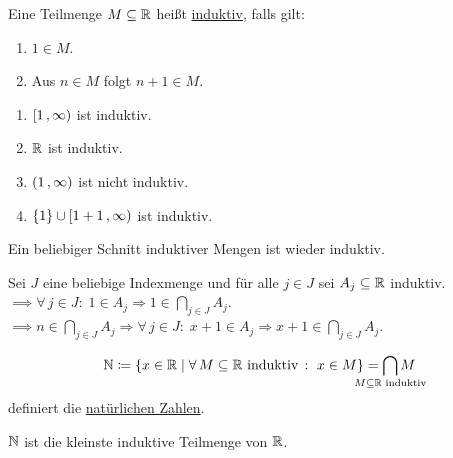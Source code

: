 \documentclass[../ana1.tex]{subfiles}
\begin{document}
\iftoggle{short}{}{\newpage}%

\begin{defi}
	Eine Teilmenge \(M \subseteq \mathbb{R} \) heißt \underline{induktiv}, falls gilt:
	\begin{enumerate}[label= (I\arabic*)]
		\item\label{ax:I1} \(1 \in M \).
		\item\label{ax:I2} Aus \(n \in M \) folgt \(n + 1 \in M \).
	\end{enumerate}
\end{defi}

\begin{bspe}\leavevmode
	\begin{enumerate}[(1)]
		\item \([1 \operatorname{,} \infty) \) ist induktiv.
		\item \(\mathbb{R} \) ist induktiv.
		\item \((1 \operatorname{,} \infty) \) ist nicht induktiv.
		\item \(\{1\} \cup [1+1 \operatorname{,} \infty) \) ist induktiv.
	\end{enumerate}
\end{bspe}

\begin{bem}
	Ein beliebiger Schnitt induktiver Mengen ist wieder induktiv.
\end{bem}
\begin{bew}
	Sei \(J \) eine beliebige Indexmenge und für alle \(j \in J \) sei \(A_{j} \subseteq \mathbb{R} \) induktiv. \\
	\(\implies \forall \, j \in J \colon \; 1 \in A_{j} \Rightarrow 1 \in \underset{j \in J}{\bigcap}A_{j} \). \\
	\(\implies n \in \underset{j \in J}{\bigcap}A_{j} \Rightarrow \forall \, j \in J \colon \; x + 1 \in A_{j} \Rightarrow x + 1 \in \underset{j \in J}{\bigcap}A_{j} \).
\end{bew}

\begin{defi}
	\[\N \coloneqq \set{x \in \R  \; \vert  \; \forall \, M \subseteq \R \text{ induktiv } \colon \; x \in M} = \smashoperator{\bigcap_{M \subseteq \R \text{ induktiv}}} M \]
	definiert die \underline{natürlichen Zahlen}.
\end{defi}

\begin{bem}
	\(\mathbb{N} \) ist die kleinste induktive Teilmenge von \(\mathbb{R} \).
\end{bem}
\end{document}
